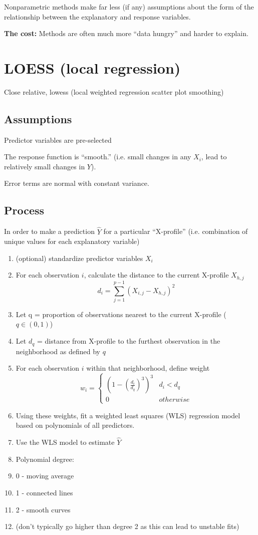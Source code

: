 \documentclass[12pt]{notes}
\begin{document}
Nonparametric methods make far less (if any) assumptions about the form of the relationship between the explanatory and response variables. 

\nspace
\textbf{The cost:} Methods are often much more ``data hungry'' and harder to explain. 

\section{LOESS (\textbf{lo}cal \textbf{re}gression)}
Close relative, lowess (local weighted regression scatter plot smoothing)

\subsection{Assumptions}
\bi
\item Predictor variables are pre-selected
\item The response function is ``smooth.'' (i.e. small changes in any $X_i$, lead to relatively small changes in $Y$). 
\item Error terms are normal with constant variance. 
\ei

\subsection{Process}
In order to make a prediction $\hat{Y}$ for a particular ``X-profile'' (i.e. combination of unique values for each explanatory variable)
\begin{enumerate}
\item (optional) standardize predictor variables $X_i$
\item For each observation $i$, calculate the distance to the current X-profile $X_{h, j}$
$$d_i = \sum_{j=1}^{p-1}\left(X_{i,j} - X_{h,j}\right)^2$$
\item Let q = proportion of observations nearest to the current X-profile ($q\in (0, 1)$)
\item Let $d_q$ = distance from X-profile to the furthest observation in the neighborhood as defined by $q$
\item For each observation $i$ within that neighborhood, define weight 
$$w_i = 
\begin{cases}
\left(1-\left(\frac{d_i}{d_q}\right)^3\right)^3 & d_i < d_q \\
0 & otherwise
\end{cases}
$$
\item Using these weights, fit a weighted least squares (WLS) regression model based on polynomials of all predictors. 
\item Use the WLS model to estimate $\hat{Y}$
\bi
\item Polynomial degree:
\bi
\item 0 - moving average
\item 1 - connected lines
\item 2 - smooth curves
\item (don't typically go higher than degree 2 as this can lead to unstable fits)
\ei
\ei
\end{enumerate}
\end{document}
